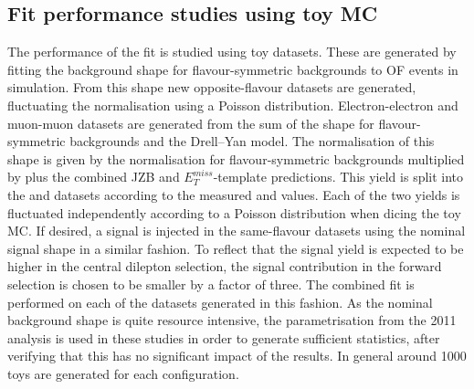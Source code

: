 \subsection{Fit performance studies using toy MC}
\label{sec:toys}
The performance of the fit is studied using toy datasets. These are generated by fitting the background shape for flavour-symmetric backgrounds to OF events in simulation. From this shape new opposite-flavour datasets are generated, fluctuating the normalisation using a Poisson distribution. Electron-electron and muon-muon datasets are generated from the sum of the  shape for flavour-symmetric backgrounds and the Drell--Yan model. The normalisation of this shape is given by the normalisation for flavour-symmetric backgrounds multiplied by \Rsfof plus the combined JZB and $E_T^{miss}$-template predictions. This yield is split into the \EE and \MM datasets according to the measured \Reeof and \Rmmof values. Each of the two yields is fluctuated independently according to a Poisson distribution when dicing the toy MC. If desired, a signal is injected in the same-flavour datasets using the nominal signal shape in a similar fashion. To reflect that the signal yield is expected to be higher in the central dilepton selection, the signal contribution in the forward selection is chosen to be smaller by a factor of three. The combined fit is performed on each of the datasets generated in this fashion. As the nominal background shape is quite resource intensive, the parametrisation from the 2011 analysis is used in these studies in order to generate sufficient statistics, after verifying that this has no significant impact of the results. In general around 1000 toys are generated for each configuration.
